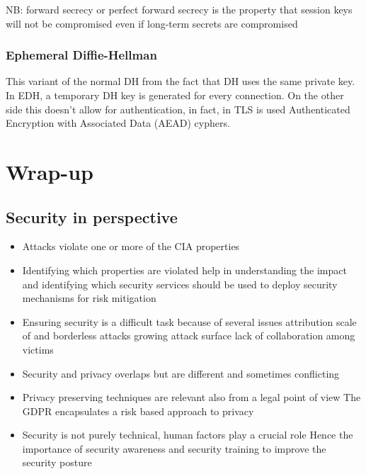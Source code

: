 \documentclass[12pt, a4paper]{article}
\begin{document}
NB: forward secrecy or perfect forward secrecy is the property that session keys will not be compromised even
if long-term secrets are compromised

\subsubsection{Ephemeral Diffie-Hellman}
This variant of the normal DH from the fact that DH uses the same private key. In EDH, a temporary DH key is 
generated for every connection. On the other side this doesn't allow for authentication, in fact, in TLS is used 
Authenticated Encryption with Associated Data (AEAD) cyphers.

\newpage
\section{Wrap-up}
\subsection{Security in perspective}
\begin{itemize}
    \item Attacks violate one or more of the CIA properties
    \item Identifying which properties are violated help in
    \subitem understanding the impact and
    \subitem identifying which security services should be used to deploy security mechanisms for risk mitigation
    \item Ensuring security is a difficult task because of several issues
    \subitem attribution
    \subitem scale of and borderless attacks
    \subitem growing attack surface
    \subitem lack of collaboration among victims
    \item Security and privacy overlaps but are different and sometimes conflicting
    \item Privacy preserving techniques are relevant also from a legal point of view
    \subitem The GDPR encapsulates a risk based approach to privacy
    \item Security is not purely technical, human factors play a crucial role
    \subitem Hence the importance of security awareness and security training to improve the security posture
\end{itemize}
\end{document}
